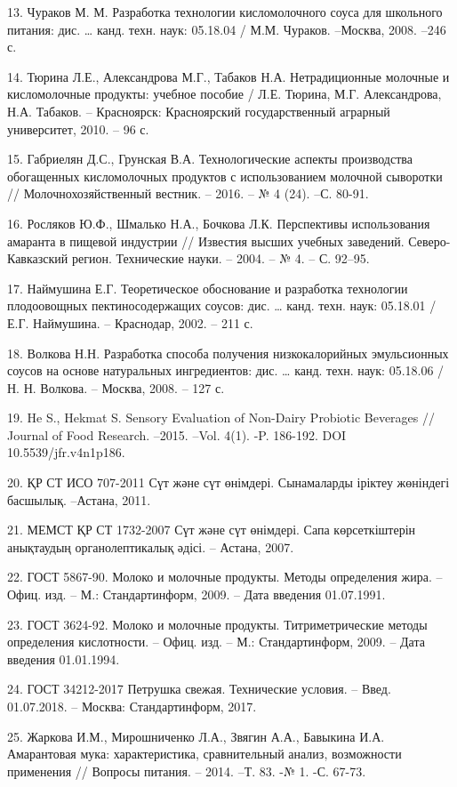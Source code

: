 \begin{references}
13. Чураков М. М. Разработка технологии кисломолочного соуса для школьного
питания: дис. \ldots{} канд. техн. наук: 05.18.04 / М.М. Чураков.
--Москва, 2008. --246 с.

14. Тюрина Л.Е., Александрова М.Г., Табаков Н.А. Нетрадиционные молочные и
кисломолочные продукты: учебное пособие / Л.Е. Тюрина, М.Г.
Александрова, Н.А. Табаков. -- Красноярск: Красноярский
государственный аграрный университет, 2010. -- 96 с.

15. Габриелян Д.С., Грунская В.А. Технологические аспекты производства
обогащенных кисломолочных продуктов с использованием молочной
сыворотки // Молочнохозяйственный вестник. -- 2016. -- № 4 (24). --С.
80-91.

16. Росляков Ю.Ф., Шмалько Н.А., Бочкова Л.К. Перспективы использования
амаранта в пищевой индустрии // Известия высших учебных заведений.
Северо-Кавказский регион. Технические науки. -- 2004. -- № 4. -- С.
92--95.

17. Наймушина Е.Г. Теоретическое обоснование и разработка технологии
плодоовощных пектиносодержащих соусов: дис. \ldots{} канд. техн. наук:
05.18.01 / Е.Г. Наймушина. -- Краснодар, 2002. -- 211 с.

18. Волкова Н.Н. Разработка способа получения низкокалорийных эмульсионных
соусов на основе натуральных ингредиентов: дис. \ldots{} канд. техн.
наук: 05.18.06 / Н. Н. Волкова. -- Москва, 2008. -- 127 с.

19. He S., Hekmat S. Sensory Evaluation of Non-Dairy Probiotic Beverages
// Journal of Food Research. --2015. --Vol. 4(1). -P. 186-192. DOI
10.5539/jfr.v4n1p186.

20. ҚР СТ ИСО 707-2011 Сүт және сүт өнімдері. Сынамаларды іріктеу
жөніндегі басшылық. --Астана, 2011.

21. МЕМСТ ҚР СТ 1732-2007 Сүт және сүт өнімдері. Сапа көрсеткіштерін
анықтаудың органолептикалық әдісі. -- Астана, 2007.

22. ГОСТ 5867-90. Молоко и молочные продукты. Методы определения жира. --
Офиц. изд. -- М.: Стандартинформ, 2009. -- Дата введения 01.07.1991.

23. ГОСТ 3624-92. Молоко и молочные продукты. Титриметрические методы
определения кислотности. -- Офиц. изд. -- М.: Стандартинформ, 2009. --
Дата введения 01.01.1994.

24. ГОСТ 34212-2017 Петрушка свежая. Технические условия. -- Введ.
01.07.2018. -- Москва: Стандартинформ, 2017.

25. Жаркова И.М., Мирошниченко Л.А., Звягин А.А., Бавыкина И.А.
Амарантовая мука: характеристика, сравнительный анализ, возможности
применения // Вопросы питания. -- 2014. --Т. 83. -№ 1. -С. 67-73.
\end{references}


